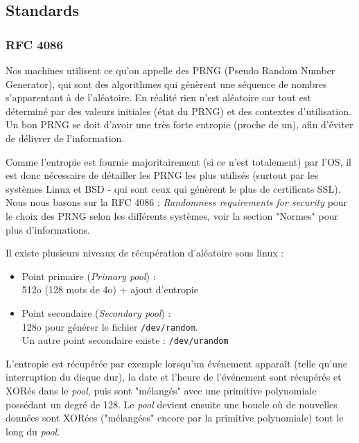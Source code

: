\subsection{Standards}
	\subsubsection{RFC 4086}

			Nos machines utilisent ce qu'on appelle des PRNG (Pseudo Random Number
			Generator), qui sont des algorithmes qui génèrent une 
			séquence de nombres s'apparentant à de l'aléatoire.
			En réalité rien n'est aléatoire car tout est déterminé par
			des valeurs initiales (état du PRNG) et des contextes 
			d'utilisation.\\
			
			Un bon PRNG se doit d'avoir une très forte entropie (proche de un),
			afin d'éviter de délivrer de l'information.
		
			Comme l'entropie est fournie majoritairement (si ce n'est totalement)
			par l'OS, il est donc nécessaire de détailler les PRNG les plus
			utilisés (surtout par les systèmes Linux et BSD - qui sont 
			ceux qui génèrent le plus de certificats SSL).\\
		
			Nous nous basons sur la RFC 4086 \cite{rfc4086}: 
			\textit{Randomness requirements for security}
			pour le choix des PRNG selon les différents	systèmes, voir
			la section "Normes" pour plus d'informations.	
	
		
			Il existe plusieurs niveaux de récupération d'aléatoire sous linux  :\\
			\begin{itemize}
			\item Point primaire (\textit{Primary pool}) :\\
			512o (128 mots de 4o) + ajout d’entropie\\
			\item Point secondaire (\textit{Secondary pool}) :\\
			128o pour générer le fichier \texttt{/dev/random}. \\
			Un autre point secondaire existe : \texttt{/dev/urandom}\\
			\end{itemize}
			
			L'entropie est récupérée par exemple lorsqu'un événement apparaît 
			(telle qu'une interruption du disque dur), la date et l'heure de 
			l'événement sont récupérés et XORés dans le \textit{pool}, puis sont 
			"mélangés" avec une primitive polynomiale possédant un degré de 128. 
			Le \textit{pool} devient ensuite une boucle où de nouvelles données 
			sont XORées ("mélangées" encore par la primitive polynomiale) tout 
			le long du \textit{pool}.\\
			
